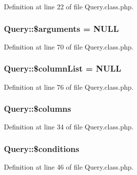 Definition at line 22 of file Query.\+class.\+php.

\hypertarget{classQuery_a49166e3c5f5198e4b899c8ee47b6258a}{}
\subsubsection[{\$arguments}]{\setlength{\rightskip}{0pt plus 5cm}Query\+::\$arguments = N\+U\+L\+L}\label{classQuery_a49166e3c5f5198e4b899c8ee47b6258a}


Definition at line 70 of file Query.\+class.\+php.

\hypertarget{classQuery_a113bcdfdc3bf6acef684a06ae324334a}{}
\subsubsection[{\$column\+List}]{\setlength{\rightskip}{0pt plus 5cm}Query\+::\$column\+List = N\+U\+L\+L}\label{classQuery_a113bcdfdc3bf6acef684a06ae324334a}


Definition at line 76 of file Query.\+class.\+php.

\hypertarget{classQuery_a7cf97254cbd55fdbb9e149723498d9ba}{}
\subsubsection[{\$columns}]{\setlength{\rightskip}{0pt plus 5cm}Query\+::\$columns}\label{classQuery_a7cf97254cbd55fdbb9e149723498d9ba}


Definition at line 34 of file Query.\+class.\+php.

\hypertarget{classQuery_a5c71d786a82b2cc014968d2553b6bc9d}{}
\subsubsection[{\$conditions}]{\setlength{\rightskip}{0pt plus 5cm}Query\+::\$conditions}\label{classQuery_a5c71d786a82b2cc014968d2553b6bc9d}


Definition at line 46 of file Query.\+class.\+php.

\hypertarget{classQuery_a76992fbfae6d700e65dfde28911a2475}{}
